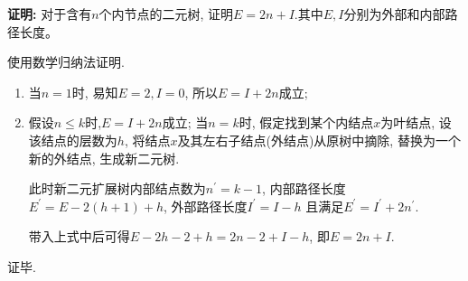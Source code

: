 \documentclass[../../main.tex]{subfiles}
\begin{document}
\begin{problem}
    \textbf{证明:} 对于含有\(n\)个内节点的二元树,
    证明\(E=2n+I\).其中\(E,I\)分别为外部和内部路径长度。
\end{problem}


\begin{solution}
    使用数学归纳法证明.
    \begin{enumerate}
        \item 当\(n=1\)时, 易知\(E=2, I=0\), 所以\(E=I+2n\)成立; 
        \item 假设\(n \le k\)时,\( E=I+2n\)成立; 
        当\(n=k\)时, 假定找到某个内结点\(x\)为叶结点, 设该结点的层数为\(h\), 
        将结点\(x\)及其左右子结点(外结点)从原树中摘除, 替换为一个新的外结点, 生成新二元树.
        
        此时新二元扩展树内部结点数为\(n^{'} = k - 1\), 
        内部路径长度\(E^{'} = E-2(h+1)+h\), 
        外部路径长度\(I^{'} = I-h\)
        且满足\(E^{'}=I^{'}+2n^{'}\).
        
        带入上式中后可得\(E-2h-2+h=2n-2+I-h\), 
        即\(E=2n+I\).
    \end{enumerate}
证毕.
\end{solution}
\end{document}
